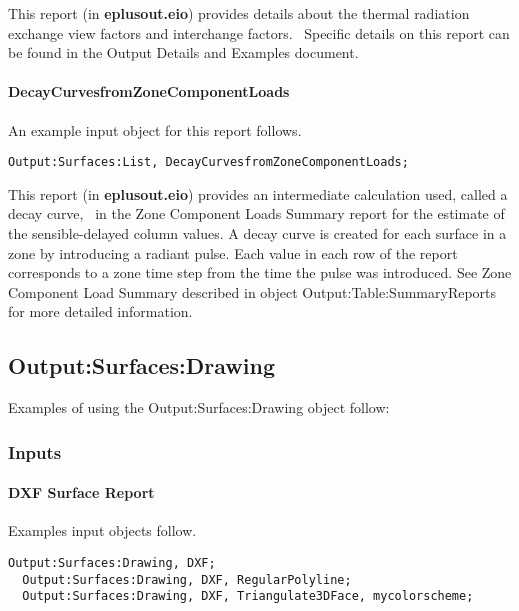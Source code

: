 This report (in \textbf{eplusout.eio}) provides details about the thermal radiation exchange view factors and interchange factors.~ Specific details on this report can be found in the Output Details and Examples document.

\paragraph{DecayCurvesfromZoneComponentLoads}\label{decaycurvesfromzonecomponentloads}

An example input object for this report follows.

\begin{lstlisting}
Output:Surfaces:List, DecayCurvesfromZoneComponentLoads;
\end{lstlisting}

This report (in \textbf{eplusout.eio}) provides an intermediate calculation used, called a decay curve,~ in the Zone Component Loads Summary report for the estimate of the sensible-delayed column values. A decay curve is created for each surface in a zone by introducing a radiant pulse. Each value in each row of the report corresponds to a zone time step from the time the pulse was introduced. See Zone Component Load Summary described in object Output:Table:SummaryReports for more detailed information.

\subsection{Output:Surfaces:Drawing}\label{outputsurfacesdrawing}

Examples of using the Output:Surfaces:Drawing object follow:

\subsubsection{Inputs}\label{inputs-1-037}

\paragraph{DXF Surface Report}\label{dxf-surface-report}

Examples input objects follow.

\begin{lstlisting}
Output:Surfaces:Drawing, DXF;
  Output:Surfaces:Drawing, DXF, RegularPolyline;
  Output:Surfaces:Drawing, DXF, Triangulate3DFace, mycolorscheme;
\end{lstlisting}

